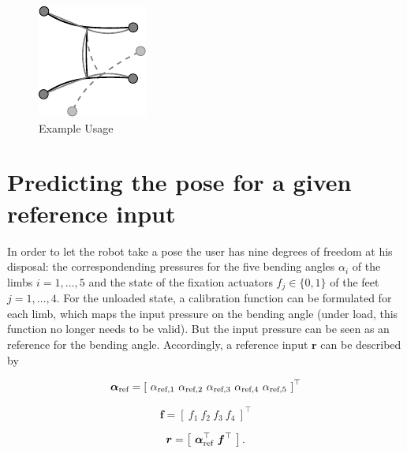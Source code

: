 \documentclass[letterpaper,10pt,conference]{ieeeconf}  %
\begin{document}
\begin{figure}[h]
\centering\includegraphics[scale=1]{../Pics/intro/intro.pdf}
\caption{Example Usage}
\label{fig:example}
\end{figure}



\section{Predicting the pose for a given reference input}
In order to let the robot take a pose
the user has nine degrees of freedom at his disposal: 
the correspondending pressures for the five bending angles $\alpha_i$ of the limbs $i=1,\dots,5$ and the state of the fixation actuators $f_j \in \{0,1\}$ of the feet $j=1,\dots,4$.
For the unloaded state, a calibration function can be formulated for each limb, which maps the input pressure on the bending angle (under load, this function no longer needs to be valid).
But the input pressure can be seen as an reference for the bending angle.
Accordingly, a reference input $\bm{r}$ can be described by

\begin{equation}
\bm{\alpha}_{\textnormal{ref}} = \left[~ \alpha_{\textnormal{ref},1}~\alpha_{\textnormal{ref},2}~\alpha_{\textnormal{ref},3}~\alpha_{\textnormal{ref},4}~\alpha_{\textnormal{ref},5}~\right]^\top
\end{equation}

\begin{equation}
\bm{f} = \left[~f_1~f_2~f_3~f_4~\right]^\top
\end{equation}


\begin{equation}
\bm{r} = \left[~\bm{\alpha_{\textnormal{ref}}}^\top~\bm{f}^\top~\right].
\end{equation}

%
\end{document}
